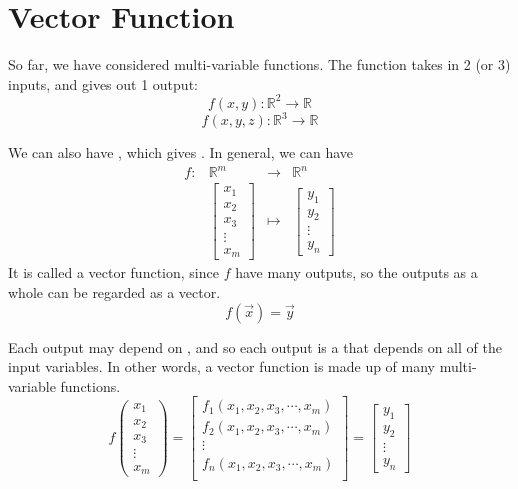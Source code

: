 \section{Vector Function}

So far, we have considered multi-variable functions. The function takes in 2 (or 3) inputs, and gives out 1 output:
$$f(x, y): \mathbb{R}^2 \to \mathbb{R}$$
$$f(x, y, z): \mathbb{R}^3 \to \mathbb{R}$$

We can also have , which gives . In general, we can have $$\begin{matrix} f: &\mathbb{R}^m &\to &\mathbb{R}^n \\ &\begin{bmatrix} x_1 \\ x_2 \\ x_3 \\ \vdots \\ x_m \end{bmatrix} &\mapsto &\begin{bmatrix} y_1 \\ y_2 \\ \vdots \\ y_n \end{bmatrix} \end{matrix}$$ It is called a vector function, since $f$ have many outputs, so the outputs as a whole can be regarded as a vector. $$f(\vec{x}) = \vec{y}$$

Each output may depend on , and so each output is a  that depends on all of the input variables. In other words, a vector function is made up of many multi-variable functions. $$f\begin{pmatrix}
        x_1 \\ x_2 \\ x_3 \\ \vdots \\ x_m
    \end{pmatrix} = \begin{bmatrix}
        f_1(x_1, x_2, x_3, \cdots, x_m) \\
        f_2(x_1, x_2, x_3, \cdots, x_m) \\
        \vdots                          \\
        f_n(x_1, x_2, x_3, \cdots, x_m) \\
    \end{bmatrix} = \begin{bmatrix}
        y_1 \\ y_2 \\ \vdots \\ y_n
    \end{bmatrix}$$

